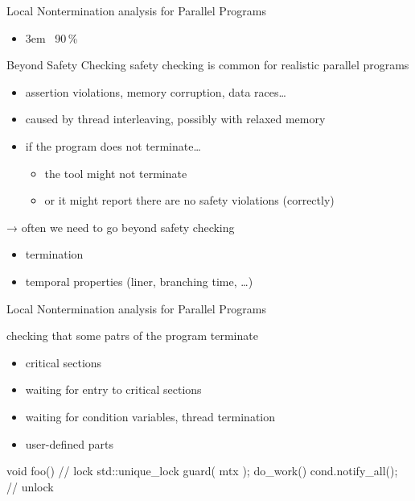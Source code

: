 \documentclass[aspectratio=169, fi]{paradise-slide}
\newcommand{\fcite}[1]{\emergencystretch 3em{\protect\NoHyper\cite{#1}}~\fullcite{#1}}
\newenvironment{prespart}[1]{%
  \begin{frame}{}%
    \centering
      {\Large #1} \par\bigskip\bigskip%
}{%
  \end{frame}%
}
\begin{document}
\begin{prespart}{Local Nontermination analysis for Parallel Programs}
  \begin{itemize}
    \item \fcite{SB2019} \hfill 90\,\%
  \end{itemize}
\end{prespart}

\begin{frame}{Beyond Safety Checking}
  safety checking is common for realistic parallel programs
  \begin{itemize}
    \item assertion violations, memory corruption, data races…
    \item caused by thread interleaving, possibly with relaxed memory
    \pause
    \item if the program does not terminate…
    \begin{itemize}
      \item the tool might not terminate
      \item or it might report there are no safety violations (correctly)
    \end{itemize}
  \end{itemize}

  \pause\bigskip
  → often we need to go beyond safety checking
  \begin{itemize}
    \item termination
    \item temporal properties (liner, branching time, …)
  \end{itemize}
\end{frame}

\begin{frame}[fragile]{Local Nontermination analysis for Parallel Programs}
  \begin{minipage}{0.49\textwidth}
    checking that some patrs of the program terminate
    \begin{itemize}
      \item critical sections
      \item waiting for entry to critical sections
      \item waiting for condition variables, thread termination
      \item user-defined parts
    \end{itemize}
  \end{minipage}
  \hfill
  \begin{minipage}{0.47\textwidth}
    \begin{cppcode}
      void foo() {
        // lock
        std::unique_lock guard( mtx );
        do_work()
        cond.notify_all();
      } // unlock
    \end{cppcode}
  \end{minipage}
\end{frame}
\end{document}
